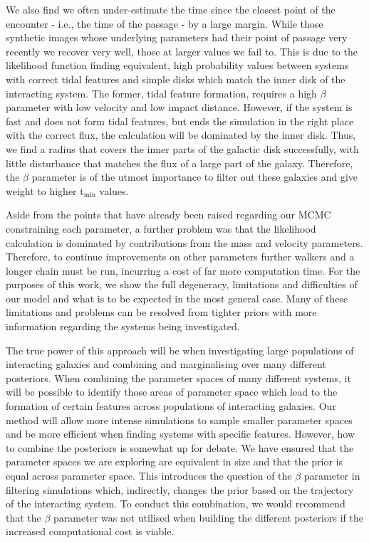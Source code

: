 We also find we often under-estimate the time since the closest point of the encounter - i.e., the time of the passage - by a large margin. While those synthetic images whose underlying parameters had their point of passage very recently we recover very well, those at larger values we fail to. This is due to the likelihood function finding equivalent, high probability values between systems with correct tidal features and simple disks which match the inner disk of the interacting system. The former, tidal feature formation, requires a high $\beta$ parameter with low velocity and low impact distance. However, if the system is fast and does not form tidal features, but ends the simulation in the right place with the correct flux, the calculation will be dominated by the inner disk. Thus, we find a radius that covers the inner parts of the galactic disk successfully, with little disturbance that matches the flux of a large part of the galaxy. Therefore, the $\beta$ parameter is of the utmost importance to filter out these galaxies and give weight to higher t$_{\mathrm{min}}$ values.

Aside from the points that have already been raised regarding our MCMC constraining each parameter, a further problem was that the likelihood calculation is dominated by contributions from the mass and velocity parameters. Therefore, to continue improvements on other parameters further walkers and a longer chain must be run, incurring a cost of far more computation time. For the purposes of this work, we show the full degeneracy, limitations and difficulties of our model and what is to be expected in the most general case. Many of these limitations and problems can be resolved from tighter priors with more information regarding the systems being investigated.

The true power of this approach will be when investigating large populations of interacting galaxies and combining and marginalising over many different posteriors. When combining the parameter spaces of many different systems, it will be possible to identify those areas of parameter space which lead to the formation of certain features across populations of interacting galaxies. Our method will allow more intense simulations to sample smaller parameter spaces and be more efficient when finding systems with specific features. However, how to combine the posteriors is somewhat up for debate. We have ensured that the parameter spaces we are exploring are equivalent in size and that the prior is equal across parameter space. This introduces the question of the $\beta$ parameter in filtering simulations which, indirectly, changes the prior based on the trajectory of the interacting system. To conduct this combination, we would recommend that the $\beta$ parameter was not utilised when building the different posteriors if the increased computational cost is viable.

